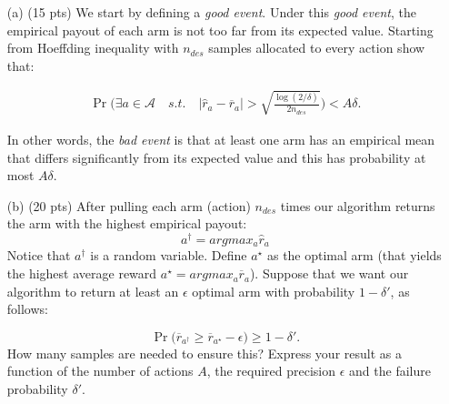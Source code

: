 \documentclass{article}
\begin{document}
\begin{enumerate}
\item[(a) (15 pts)] We start by defining a \emph{good event}. Under this \emph{good event}, the empirical payout of each arm is not too far from its expected value. Starting from Hoeffding inequality with $n_{des}$ samples allocated to every action show that:

\begin{align*}
\Pr\Bigg(\exists a \in \mathcal A \quad s.t. \quad |\widehat r_a - \overline r_a | > \sqrt{\frac{\log(2/\delta)}{2n_{des}}}	\Bigg) < A\delta.
\end{align*}

In other words, the \emph{bad event} is that at least one arm has an empirical mean that differs significantly from its expected value and this has probability at most $A\delta$.

\item[(b) (20 pts)] After pulling each arm (action) $n_{des}$ times our algorithm returns the arm with the highest empirical payout:
\begin{equation*}
a^\dagger = argmax_{a} \widehat r_a	
\end{equation*}
Notice that $a^\dagger$ is a random variable.
 Define ${a^\star}$ as the optimal arm (that yields the highest average reward ${a^\star} = argmax_a \overline r_{a}$). Suppose that we want our algorithm to return at least an $\epsilon$ optimal arm with probability $1-\delta'$, as follows:

\begin{equation*}
	\Pr \Bigg(\overline r_{a^\dagger} \geq  \overline r_{a^\star} - \epsilon \Bigg) \geq 1-\delta'.
\end{equation*}
How many samples are needed to ensure this? Express your result as a function of the number of actions $A$, the required precision $\epsilon$ and the failure probability $\delta'$.
\end{enumerate}

\printbibliography
\end{document}

